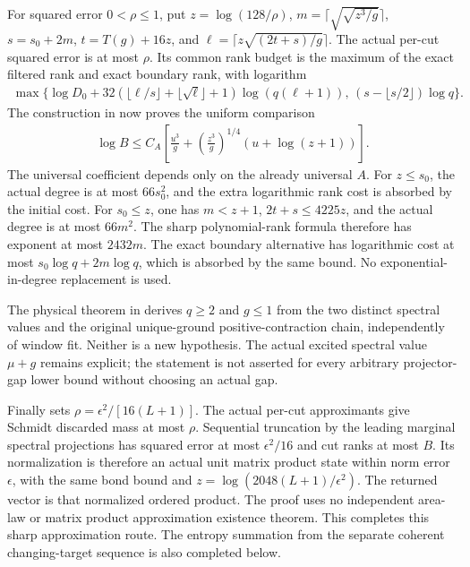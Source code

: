 \documentclass{article}
\begin{document}
For squared error $0<\rho\le1$, put $z=\log(128/\rho)$,
$m=\lceil\sqrt{\sqrt{z^3/g}}\rceil$, $s=s_0+2m$,
$t=T(g)+16z$, and $\ell=\lceil z\sqrt{(2t+s)/g}\rceil$.
The actual per-cut squared error is at most $\rho$. Its common rank budget
is the maximum of the exact filtered rank and exact boundary rank, with
logarithm
\begin{align*}
\max\bigl\{\log D_0+
32(\lfloor\ell/s\rfloor+\lfloor\sqrt\ell\rfloor+1)\log(q(\ell+1)),\,
(s-\lfloor s/2\rfloor)\log q\bigr\}.
\end{align*}
The construction in 
now proves the uniform comparison
\begin{align*}
 \log B\le C_A\left[\frac{u^3}{g}+
      \left(\frac{z^3}{g}\right)^{1/4}(u+\log(z+1))\right].
\end{align*}
The universal coefficient depends only on the already universal $A$.
For $z\le s_0$, the actual degree is at most $66s_0^2$, and the extra
logarithmic rank cost is absorbed by the initial cost. For $s_0\le z$,
one has $m<z+1$, $2t+s\le4225z$, and the actual degree is at most
$66m^2$. The sharp polynomial-rank formula therefore has exponent at
most $2432m$. The exact boundary alternative has logarithmic cost at
most $s_0\log q+2m\log q$, which is absorbed by the same bound.
No exponential-in-degree replacement is used.

The physical theorem in
derives $q\ge2$ and $g\le1$ from the two distinct spectral values and
the original unique-ground positive-contraction chain, independently
of window fit. Neither is a new hypothesis. The actual excited spectral
value $\mu+g$ remains explicit; the statement is not asserted for every
arbitrary projector-gap lower bound without choosing an actual gap.

Finally 
sets $\rho=\epsilon^2/[16(L+1)]$. The actual per-cut approximants give
Schmidt discarded mass at most $\rho$. Sequential truncation by the
leading marginal spectral projections has squared error at most
$\epsilon^2/16$ and cut ranks at most $B$. Its normalization is therefore
an actual unit matrix product state within norm error $\epsilon$, with
the same bond bound and
$z=\log(2048(L+1)/\epsilon^2)$. The returned vector is that normalized
ordered product. The proof uses no independent area-law or matrix
product approximation existence theorem. This completes this sharp
approximation route. The entropy summation from the separate coherent
changing-target sequence is also completed below.
\end{document}
